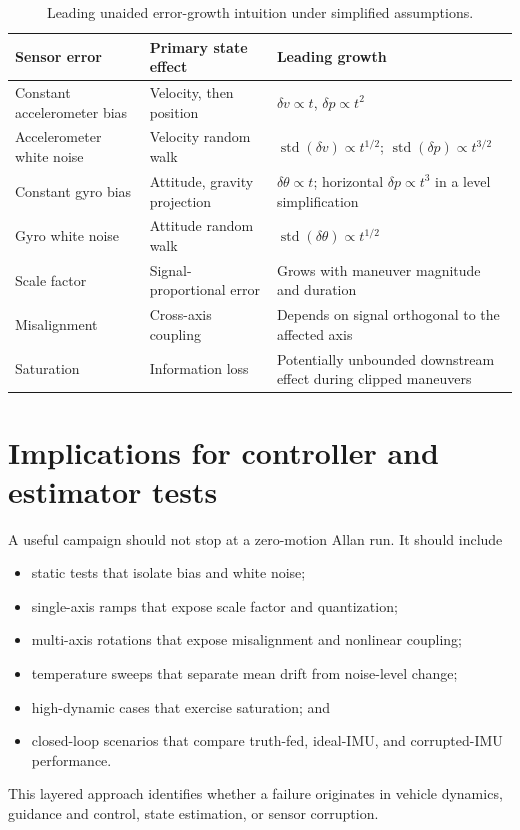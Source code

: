 \documentclass[11pt,oneside,headings=big]{scrreprt}
\begin{document}
    \begin{table}[htbp]
        \centering
        \caption{Leading unaided error-growth intuition under simplified assumptions.}
        \label{tab:error-growth}
        \begin{tabularx}{\textwidth}{@{}L{1.65in}L{1.55in}Y@{}}
\toprule
\textbf{Sensor error} & \textbf{Primary state effect} & \textbf{Leading growth} \\
\midrule
Constant accelerometer bias & Velocity, then position & $\delta v\propto t$, $\delta p\propto t^2$ \\
Accelerometer white noise & Velocity random walk & $\operatorname{std}(\delta v)\propto t^{1/2}$; $\operatorname{std}(\delta p)\propto t^{3/2}$ \\
Constant gyro bias & Attitude, gravity projection & $\delta\theta\propto t$; horizontal $\delta p\propto t^3$ in a level simplification \\
Gyro white noise & Attitude random walk & $\operatorname{std}(\delta\theta)\propto t^{1/2}$ \\
Scale factor & Signal-proportional error & Grows with maneuver magnitude and duration \\
Misalignment & Cross-axis coupling & Depends on signal orthogonal to the affected axis \\
Saturation & Information loss & Potentially unbounded downstream effect during clipped maneuvers \\
\bottomrule
        \end{tabularx}
    \end{table}


    \section{Implications for controller and estimator tests}
    A useful campaign should not stop at a zero-motion Allan run. It should include
    \begin{itemize}
        \item static tests that isolate bias and white noise;
        \item single-axis ramps that expose scale factor and quantization;
        \item multi-axis rotations that expose misalignment and nonlinear coupling;
        \item temperature sweeps that separate mean drift from noise-level change;
        \item high-dynamic cases that exercise saturation; and
        \item closed-loop scenarios that compare truth-fed, ideal-IMU, and corrupted-IMU
        performance.
    \end{itemize}
    This layered approach identifies whether a failure originates in vehicle
    dynamics, guidance and control, state estimation, or sensor corruption.
\end{document}
